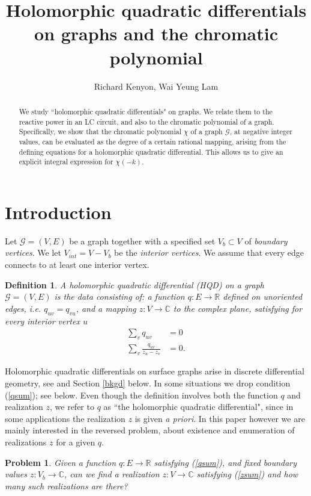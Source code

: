 \documentclass[12pt]{amsart}
\title[Holomorphic quadratic differentials on graphs]{Holomorphic quadratic differentials on graphs and the chromatic polynomial}
\author{Richard Kenyon, Wai Yeung Lam}
\newtheorem{definition}[theorem]{Definition}
\newtheorem{problem}[theorem]{Problem}
\newcommand{\C}{{\mathbb C}}
\newcommand{\R}{{\mathbb R}}
\newcommand{\G}{{\mathcal G}}
\begin{document}
\begin{abstract}
We study ``holomorphic quadratic differentials" on graphs. We relate them to the reactive power in an LC circuit, 
and also to the chromatic polynomial of a graph.
Specifically, we show that the chromatic polynomial $\chi$ of a graph $\G$, at negative integer values, can be evaluated as the degree
of a certain rational mapping, arising from the defining equations for a holomorphic quadratic differential.  
This allows us to give an explicit integral expression for $\chi(-k)$.
\end{abstract}

\maketitle

\section{Introduction}
Let $\mathcal{G}=(V,E)$ be a graph together with a specified set $V_{b} \subset V$ of \emph{boundary vertices}. We let $V_{int}= V -V_{b}$ 
be the \emph{interior vertices}.  We assume that every edge connects to at least one interior vertex.

\begin{definition}
A \emph{holomorphic quadratic differential (HQD)} on a graph $\G=(V,E)$ is the data consisting of:
a function $q: E \to \mathbb{R}$ defined on unoriented edges, i.e. $q_{uv} = q_{vu}$, and 
a mapping $z:V \to \mathbb{C}$ to the complex plane, satisfying for every interior vertex $u$
\begin{align}
	\sum_v q_{uv} &=0 \label{qsum}\\
	\sum_v \frac{q_{uv}}{z_u -z_v} &=0.\label{zsum}
\end{align} 
\end{definition}

Holomorphic quadratic differentials on surface graphs arise in discrete differential geometry,
see \cite{Lam2015a} and Section \ref{bkgd} below. 
In some situations we drop condition (\ref{qsum}); see below.
Even though the definition involves both the function $q$ and realization $z$, we refer to $q$ as ``the holomorphic quadratic
differential", since in some applications the realization $z$ is given {\it a priori}. 
In this paper however we are mainly interested in the reversed problem, about existence and enumeration of realizations $z$
for a given $q$.

\begin{problem}\label{2}
Given a function $q:E\to\R$ satisfying (\ref{qsum}), and fixed boundary values 
$z:V_b\to\C$, can we find a realization $z:V\to\C$ satisfying (\ref{zsum})  
and how many such realizations are there?
\end{problem}
\end{document}

